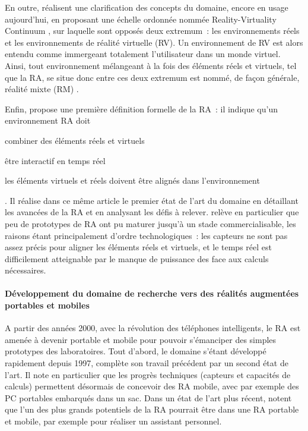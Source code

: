 En outre, \citet{MilgramKishino1994} réalisent une clarification des concepts du domaine, encore en usage aujourd'hui, en proposant une échelle ordonnée nommée \foreignlanguage{english}{Reality-Virtuality Continuum} , sur laquelle sont opposés deux extremum~: les environnements réels et les environnements de réalité virtuelle (RV). Un environnement de RV est alors entendu comme immergeant totalement l'utilisateur dans un monde virtuel. Ainsi, tout environnement mélangeant à la fois des éléments réels et virtuels, tel que la RA, se situe donc entre ces deux extremum est nommé, de façon générale, réalité mixte (RM) \citep{MilgramKishino1994}.

Enfin, \citet{Azuma1997} propose une première définition formelle de la RA~: il indique qu'un environnement RA doit 
\begin{enumerate*}[label=\emph{\arabic*})]
\item combiner des éléments réels et virtuels
\item être interactif en temps réel
\item les éléments virtuels et réels doivent être alignés dans l'environnement
\end{enumerate*}. Il réalise dans ce même article le premier état de l'art du domaine en détaillant les avancées de la RA et en analysant les défis à relever. \citet{Azuma1997} relève en particulier que peu de prototypes de RA ont pu maturer jusqu'à un stade commercialisable, les raisons étant principalement d'ordre technologiques~: les capteurs ne sont pas assez précis pour aligner les éléments réels et virtuels, et le temps réel est difficilement atteignable par le manque de puissance des face aux calculs nécessaires.


\paragraph*{Développement du domaine de recherche vers des réalités augmentées portables et mobiles}
A partir des années 2000, avec la révolution des téléphones intelligents, le RA est amenée à devenir portable et mobile pour pouvoir s'émanciper des simples prototypes des laboratoires. Tout d'abord, le domaine s'étant développé rapidement depuis 1997, \citet{AzumaBaillotBehringerEtAl2001} complète son travail précédent par un second état de l'art. Il note en particulier que les progrès techniques (capteurs et capacités de calculs) permettent désormais de concevoir des RA mobile, avec par exemple des PC portables embarqués dans un sac. Dans un état de l'art plus récent, \citet{VanKrevelenPoelman2010} notent que l'un des plus grands potentiels de la RA pourrait être dans une RA portable et mobile, par exemple pour réaliser un assistant personnel.

